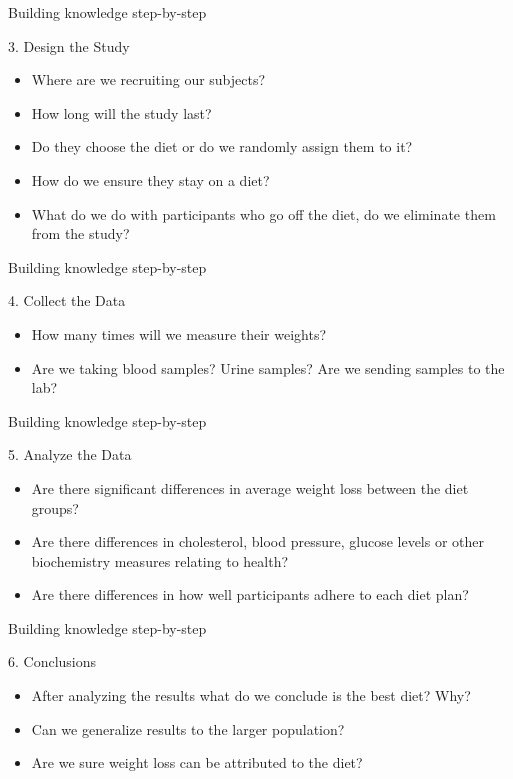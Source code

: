 \documentclass[14pt]{beamer}\usepackage[]{graphicx}\usepackage[]{color}
\begin{document}
\begin{frame}[fragile]{Building knowledge step-by-step}

3. Design the Study

\begin{itemize}
\item Where are we recruiting our subjects?
\item How long will the study last?
\item Do they choose the diet or do we randomly assign them to it?
\item How do we ensure they stay on a diet?
\item What do we do with participants who go off the diet, do we eliminate them from the study?
\end{itemize}
\end{frame}

\begin{frame}[fragile]{Building knowledge step-by-step}

4. Collect the Data

\begin{itemize}
\item How many times will we measure their weights?
\item Are we taking blood samples? Urine samples? Are we sending samples to the lab?
\end{itemize}
\end{frame}

\begin{frame}[fragile]{Building knowledge step-by-step}

5. Analyze the Data

\begin{itemize}
\item Are there significant differences in average weight loss between the diet groups?
\item Are there differences in cholesterol, blood pressure, glucose levels or other biochemistry measures relating to health?
\item Are there differences in how well participants adhere to each diet plan?
\end{itemize}
\end{frame}

\begin{frame}[fragile]{Building knowledge step-by-step}

6. Conclusions

\begin{itemize}
\item After analyzing the results what do we conclude is the best diet? Why?
\item Can we generalize results to the larger population?
\item Are we sure weight loss can be attributed to the diet?
\end{itemize}
\end{frame}
\end{document}
